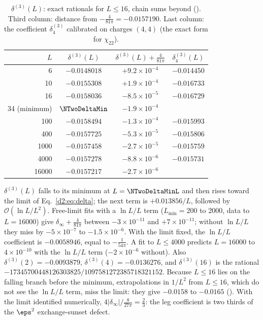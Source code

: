 \begin{table}[ht]
\centering\footnotesize\renewcommand{\arraystretch}{1.15}
\begin{tabular}{@{}rccc@{}}
\toprule
$L$ & $\delta^{(3)}(L)$ & $\delta^{(3)}(L)+\frac4{81\pi}$ & $\delta^{(3)}_4(L)$ \\\midrule
6 & $-0.0148018$ & $+9.2\times10^{-4}$ & $-0.014450$ \\
10 & $-0.0155308$ & $+1.9\times10^{-4}$ & $-0.016733$ \\
16 & $-0.0158036$ & $-8.5\times10^{-5}$ & $-0.016729$ \\
34 (minimum) & $\NTwoDeltaMin$ & $-1.9\times10^{-4}$ & \\
100 & $-0.0158494$ & $-1.3\times10^{-4}$ & $-0.015993$ \\
400 & $-0.0157725$ & $-5.3\times10^{-5}$ & $-0.015806$ \\
1000 & $-0.0157458$ & $-2.7\times10^{-5}$ & $-0.015759$ \\
4000 & $-0.0157278$ & $-8.8\times10^{-6}$ & $-0.015731$ \\
16000 & $-0.0157217$ & $-2.7\times10^{-6}$ & \\
\bottomrule
\end{tabular}
\caption{$\delta^{(3)}(L)$: exact rationals for $L\le16$, chain sums beyond ().
Third column: distance from $-\frac4{81\pi}=-0.0157190$. Last column: the coefficient $\delta^{(3)}_4$ calibrated on charges $(4,4)$ (the
exact form for $\chi_{22}$).}
\label{d2:tab:delta3}
\end{table}

$\delta^{(3)}(L)$ falls to its minimum at $L=\NTwoDeltaMinL$ and then rises toward the limit of Eq.~\eqref{d2:eq:delta}; the
next term is $+0.013856/L$, followed by $\mathcal O(\ln L/L^2)$. Free-limit fits with a $\ln L/L$ term ($L_{\min}=200$ to
2000, data to $L=16000$) give $\delta_\infty+\frac4{81\pi}$ between $-3\times10^{-11}$ and $+7\times10^{-11}$; without $\ln
L/L$ they miss by $-5\times10^{-7}$ to $-1.5\times10^{-6}$. With the limit fixed, the $\ln L/L$ coefficient is $-0.0058946$,
equal to $-\frac1{54\pi}$. A fit to $L\le4000$ predicts $L=16000$ to $4\times10^{-10}$ with the $\ln L/L$ term
($-2\times10^{-6}$ without). Also $\delta^{(3)}(2)=-0.0093879$, $\delta^{(3)}(4)=-0.0136276$, and $\delta^{(3)}(16)$ is the
rational $-17345700448126303825/1097581272385718321152$. Because $L\le16$ lies on the falling branch before the minimum,
extrapolations in $1/L^2$ from $L\le16$, which do not see the $\ln L/L$ term, miss the limit: they give $-0.0158$ to $-0.0165$
(). With the limit identified numerically,
$4|\delta_\infty|/\frac8{27\pi}=\frac23$: the leg coefficient is two thirds of the $\eps^2$ exchange-sunset defect.

